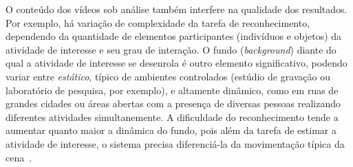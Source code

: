 %
O conteúdo dos vídeos sob análise também interfere na qualidade dos resultados. Por exemplo, há variação de complexidade da tarefa de reconhecimento, dependendo da quantidade de elementos participantes (indivíduos e objetos) da atividade de interesse e seu grau de interação. %
O fundo (\emph{background}) diante do qual a atividade de interesse se desenrola é outro elemento significativo, podendo variar entre \emph{estático}, típico de ambientes controlados (estúdio de gravação ou laboratório de pesquisa, por exemplo), e altamente dinâmico, como em ruas de grandes cidades ou áreas abertas com a presença de diversas pessoas realizando diferentes atividades simultanemente. A dificuldade do reconhecimento tende a aumentar quanto maior a dinâmica do fundo, pois além da tarefa de estimar a atividade de interesse, o sistema precisa diferenciá-la da movimentação típica da cena~\parencite{jegham-2020}.
%


